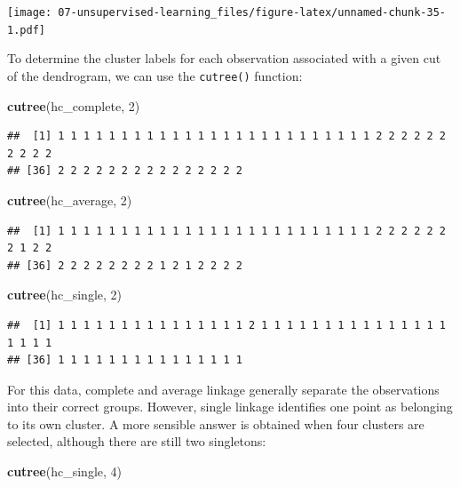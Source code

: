 \documentclass[openany]{book}
\newenvironment{Shaded}{\begin{snugshade}}{\end{snugshade}}
\newcommand{\DecValTok}[1]{\textcolor[rgb]{0.00,0.00,0.81}{#1}}
\newcommand{\KeywordTok}[1]{\textcolor[rgb]{0.13,0.29,0.53}{\textbf{#1}}}
\newcommand{\NormalTok}[1]{#1}
\begin{document}
\texttt{[image: 07-unsupervised-learning\_files/figure-latex/unnamed-chunk-35-1.pdf]}

To determine the cluster labels for each observation associated with a
given cut of the dendrogram, we can use the \texttt{cutree()} function:

\begin{Shaded}
\begin{Highlighting}[]
\KeywordTok{cutree}\NormalTok{(hc_complete, }\DecValTok{2}\NormalTok{)}
\end{Highlighting}
\end{Shaded}

\begin{verbatim}
##  [1] 1 1 1 1 1 1 1 1 1 1 1 1 1 1 1 1 1 1 1 1 1 1 1 1 1 2 2 2 2 2 2 2 2 2 2
## [36] 2 2 2 2 2 2 2 2 2 2 2 2 2 2 2
\end{verbatim}

\begin{Shaded}
\begin{Highlighting}[]
\KeywordTok{cutree}\NormalTok{(hc_average, }\DecValTok{2}\NormalTok{)}
\end{Highlighting}
\end{Shaded}

\begin{verbatim}
##  [1] 1 1 1 1 1 1 1 1 1 1 1 1 1 1 1 1 1 1 1 1 1 1 1 1 1 2 2 2 2 2 2 2 1 2 2
## [36] 2 2 2 2 2 2 2 2 1 2 1 2 2 2 2
\end{verbatim}

\begin{Shaded}
\begin{Highlighting}[]
\KeywordTok{cutree}\NormalTok{(hc_single, }\DecValTok{2}\NormalTok{)}
\end{Highlighting}
\end{Shaded}

\begin{verbatim}
##  [1] 1 1 1 1 1 1 1 1 1 1 1 1 1 1 1 2 1 1 1 1 1 1 1 1 1 1 1 1 1 1 1 1 1 1 1
## [36] 1 1 1 1 1 1 1 1 1 1 1 1 1 1 1
\end{verbatim}

For this data, complete and average linkage generally separate the observations
into their correct groups. However, single linkage identifies one point
as belonging to its own cluster. A more sensible answer is obtained when
four clusters are selected, although there are still two singletons:

\begin{Shaded}
\begin{Highlighting}[]
\KeywordTok{cutree}\NormalTok{(hc_single, }\DecValTok{4}\NormalTok{)}
\end{Highlighting}
\end{Shaded}
\end{document}
